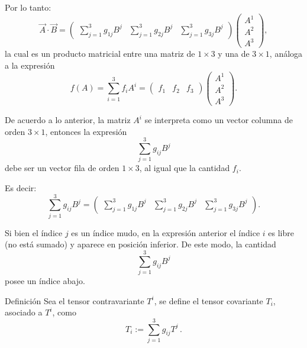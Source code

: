 \documentclass[../apunte_mecanica_clasica.tex]{subfiles}%
\begin{document}
\noindent
Por lo tanto:
\begin{equation*}
    \vec{A}\cdot \vec{B} = 
    \begin{pmatrix}
        \sum_{j=1}^3 g_{1j} B^j &
        \sum_{j=1}^3 g_{2j} B^j &
        \sum_{j=1}^3 g_{3j} B^j
    \end{pmatrix}
    \begin{pmatrix}
        A^1 \\[4pt] A^2 \\[4pt] A^3
    \end{pmatrix},
\end{equation*}
la cual es un producto matricial entre una matriz de $1\times 3$ y una de $3\times 1$, 
análoga a la expresión
\begin{equation*}
    f(A) = \sum_{i=1}^3 f_i A^i =
    \begin{pmatrix}
        f_1 & f_2 & f_3
    \end{pmatrix}
    \begin{pmatrix}
        A^1 \\[4pt] A^2 \\[4pt] A^3
    \end{pmatrix}.
\end{equation*}

De acuerdo a lo anterior, la matriz $A^i$ se interpreta como un vector columna de orden $3\times 1$, entonces la expresión
\begin{equation*}
    \sum_{j=1}^3 g_{ij} B^j
\end{equation*}
debe ser un vector fila de orden $1\times 3$, al igual que la cantidad $f_i$.

\medskip
Es decir:
\begin{equation*}
    \sum_{j=1}^3 g_{ij} B^j =
    \begin{pmatrix}
        \sum_{j=1}^3 g_{1j} B^j &
        \sum_{j=1}^3 g_{2j} B^j &
        \sum_{j=1}^3 g_{3j} B^j
    \end{pmatrix}.
\end{equation*}

Si bien el índice $j$ es un índice mudo, en la expresión anterior el índice $i$ es libre (no está sumado) y aparece en posición inferior. 
De este modo, la cantidad
\begin{equation*}
    \sum_{j=1}^3 g_{ij} B^j
\end{equation*}
posee un índice abajo.

\begin{apuntebloque}{Definición}
Sea el tensor contravariante $T^i$, se define el tensor covariante $T_i$, 
asociado a $T^i$, como
\begin{equation*}
    T_i := \sum_{j=1}^3 g_{ij} T^j \,.
\end{equation*}
\end{apuntebloque}
\end{document}

